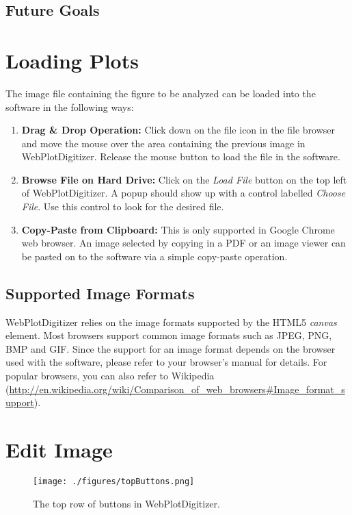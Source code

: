 \documentclass[letterpaper, 10pt]{article}
\begin{document}
\subsection{Future Goals}

\section{Loading Plots}
The image file containing the figure to be analyzed can be loaded into the software in the following ways:
\begin{enumerate}
\item{{\bf Drag \& Drop Operation:} Click down on the file icon in the file browser and move the mouse over the area containing the previous image in WebPlotDigitizer. Release the mouse button to load the file in the software.}
\item{{\bf Browse File on Hard Drive:} Click on the \emph{Load File} button on the top left of WebPlotDigitizer. A popup should show up with a control labelled \emph{Choose File}. Use this control to look for the desired file.}
\item{{\bf Copy-Paste from Clipboard:} This is only supported in Google Chrome web browser. An image selected by copying in a PDF or an image viewer can be pasted on to the software via a simple copy-paste operation.}
\end{enumerate}

\subsection{Supported Image Formats}
WebPlotDigitizer relies on the image formats supported by the HTML5 \emph{canvas} element. Most browsers support common image formats such as JPEG, PNG, BMP and GIF. Since the support for an image format depends on the browser used with the software, please refer to your browser's manual for details. For popular browsers, you can also refer to Wikipedia (\url{http://en.wikipedia.org/wiki/Comparison_of_web_browsers#Image_format_support}).




\section{Edit Image}

\begin{figure}
\begin{center}
\texttt{[image: ./figures/topButtons.png]}
\caption{The top row of buttons in WebPlotDigitizer.}
\label{fig:topButtons}
\end{center}
\end{figure}
\end{document}
